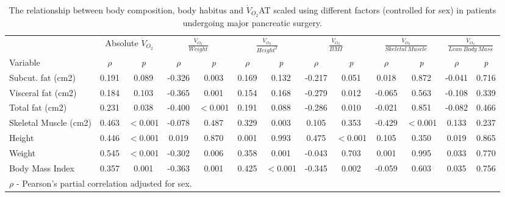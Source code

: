 \begin{sidewaystable}[p]
	\caption{The relationship between body composition, body habitus and $\dot{V}_{O_2}$AT scaled using different factors (controlled for sex) in patients undergoing major pancreatic surgery.}
	\label{table:bc_at_new_indices}
	\footnotesize
	\centering
	\renewcommand{\arraystretch}{1.5} %
	\begin{tabular}{|l|cc|cc|cc|cc|cc|cc|}
		\hline
		& \multicolumn{2}{c|}{Absolute $\dot{V}_{O_2}$} & \multicolumn{2}{c|}{$\frac{\dot{V}_{O_2}}{Weight}$} & \multicolumn{2}{c|}{$\frac{\dot{V}_{O_2}}{Height^2}$} & \multicolumn{2}{c|}{$\frac{\dot{V}_{O_2}}{BMI}$} & \multicolumn{2}{c|}{$\frac{\dot{V}_{O_2}}{Skeletal\ Muscle}$}  & \multicolumn{2}{c|}{$\frac{\dot{V}_{O_2}}{Lean\ Body\ Mass}$}\\
		
		Variable              & $\rho$ &\textit{p}& $\rho$ &\textit{p}& $\rho$ &\textit{p}& $\rho$ &\textit{p}& $\rho$ &\textit{p}& $\rho$ &\textit{p} \\ \hline
		Subcut. fat (cm2)     & 0.191  &  0.089   & -0.326 &  0.003   & 0.169  &  0.132   & -0.217 &  0.051   & 0.018  &  0.872   & -0.041 & 0.716 \\
		Visceral fat (cm2)    & 0.184  &  0.103   & -0.365 &  0.001   & 0.154  &  0.168   & -0.279 &  0.012   & -0.065 &  0.563   & -0.108 & 0.339\\
		Total fat (cm2)       & 0.231  &  0.038   & -0.400 & $<$0.001 & 0.191  &  0.088   & -0.286 &  0.010   & -0.021 &  0.851   & -0.082 & 0.466\\
		Skeletal Muscle (cm2) & 0.463  & $<$0.001 & -0.078 &  0.487   & 0.329  &  0.003   & 0.105  &  0.353   & -0.429 & $<$0.001 & 0.133 & 0.237 \\
		Height                & 0.446  & $<$0.001 & 0.019  &  0.870   & 0.001  &  0.993   & 0.475  & $<$0.001 & 0.105  &  0.350   & 0.019 & 0.865\\
		Weight                & 0.545  & $<$0.001 & -0.302 &  0.006   & 0.358  &  0.001   & -0.043 &  0.703   & 0.001  &  0.995   & 0.033 & 0.770\\
		Body Mass Index       & 0.357  &  0.001   & -0.363 &  0.001   & 0.425  & $<$0.001 & -0.345 &  0.002   & -0.059 &  0.603   & 0.035 & 0.756\\ \hline
		\multicolumn{11}{l}{$\rho$ - Pearson's partial correlation adjusted for sex.}
	\end{tabular}
\end{sidewaystable}


